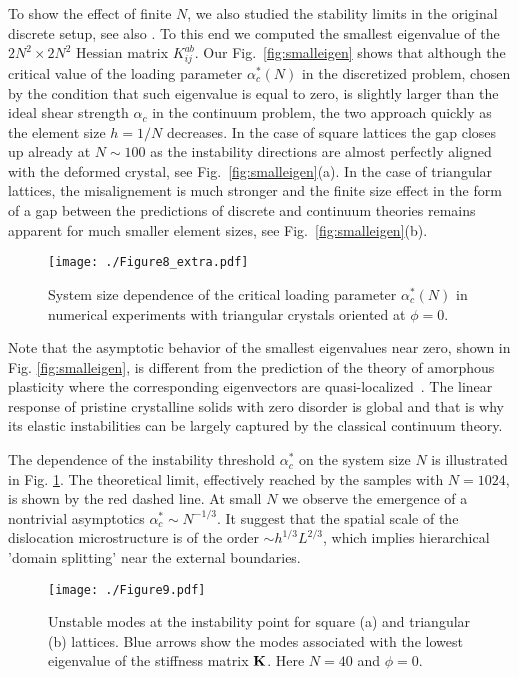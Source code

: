 \documentclass[CRPHYS,Unicode,manuscript]{cedram}
\begin{document}
To show the effect of finite $N$, we also studied the stability limits in the original discrete setup, see also  \cite{Sanderson2016-ht,Sanderson2018-rt}. To this end we   computed the   smallest eigenvalue of the $2N^2\times 2N^2$ Hessian  matrix $K^{ab}_{ij}$.   Our   Fig.~\ref{fig:smalleigen} shows   that although the critical value of the loading parameter  $\alpha_c^*(N)$ in the discretized problem, chosen by the condition that such eigenvalue is equal to zero,  is slightly larger than the ideal shear strength $\alpha_c$ in the continuum problem,  the two approach quickly  as the element size $h=1/N$ decreases. In the case of square lattices  the gap  closes up already at $N\sim 100$  as the instability directions are almost perfectly  aligned with the deformed crystal, see  Fig.~\ref{fig:smalleigen}(a).  In the case of triangular lattices, the misalignement is much stronger and the finite size effect in the form of a gap between the predictions of discrete and continuum theories remains apparent for much smaller element sizes, see Fig.~\ref{fig:smalleigen}(b). 
\begin{figure}[h!]
\centering
\texttt{[image: ./Figure8\_extra.pdf]}
\caption{\scriptsize {System size dependence  of the critical loading parameter $\alpha_c^*(N)$ in numerical experiments with  triangular crystals oriented at $\phi=0$.}
 \label{fig:smalleigen1}}
\end{figure}
Note that the asymptotic behavior of the smallest eigenvalues near zero, shown in Fig. \ref{fig:smalleigen},  is different  from the  prediction of the theory of amorphous plasticity where the corresponding eigenvectors are  quasi-localized~\cite{Dasgupta2012-uj,Bonfanti2019-xi,PhysRevMaterials.4.113609}. The linear response of pristine crystalline solids with zero  disorder is  global and that is why its elastic instabilities  can be largely captured by the classical continuum theory.

The dependence of the instability threshold $\alpha_c^*$  on the system size $N$ is illustrated in Fig. \ref{fig:smalleigen1}. The theoretical limit, effectively reached  by the samples with $N=1024$, is shown by the red dashed line. At small $N$ we observe the emergence of  a nontrivial  asymptotics $\alpha_c^* \sim N^{-1/3}$. It suggest that the  spatial scale of the dislocation microstructure  is of the order $ \sim  h^{1/3}L^{2/3}$, which implies  hierarchical 'domain splitting'  near the  external boundaries.


\begin{figure}[hbt!]
\centering
\texttt{[image: ./Figure9.pdf]}
\caption{\scriptsize {Unstable modes at the instability point   for  square  (a) and triangular (b) lattices. Blue arrows show the   modes associated with the lowest eigenvalue of the stiffness matrix $\bf{K}$. Here $N=40$ and $\phi=0$. 
}
 \label{fig:modes_sq}}
\end{figure}
%
\end{document}
